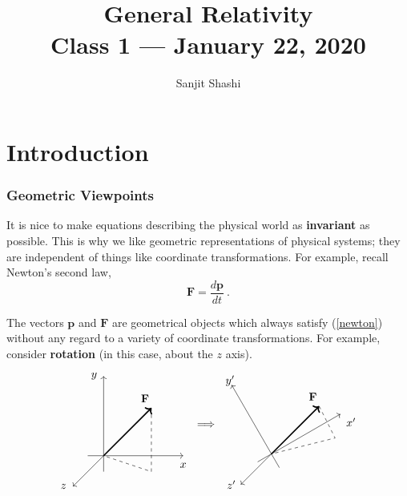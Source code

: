 \documentclass[11pt]{article}
\title{{\Huge General Relativity}\\{\Large{Class 1 --- January 22, 2020}}} %
\author{Sanjit Shashi}
\begin{document}
\maketitle
\flushbottom
\newpage
\pagestyle{fancynotes}

\part{Introduction}
\section{Geometric Viewpoints}

It is nice to make equations describing the physical world as \textbf{invariant} as possible. This is why we like geometric representations of physical systems; they are independent of things like coordinate transformations. For example, recall Newton's second law,
\begin{equation}
\textbf{F} = \frac{d\textbf{p}}{dt}\ .\label{newton}
\end{equation}

The vectors $\textbf{p}$ and $\textbf{F}$ are geometrical objects which always satisfy (\ref{newton}) without any regard to a variety of coordinate transformations. For example, consider \textbf{rotation} (in this case, about the $z$ axis).
\[
\begin{tikzpicture}
\draw[->] (-0.5,0,0) to (2.5,0,0);
\draw[->] (0,-0.5,0) to (0,2.5,0);
\draw[->] (0,0,-0.5) to (0,0,2.5);

\node at (2.5,-0.3) {$x$};
\node at (-0.3,2.5) {$y$};
\node at (-0.3,0,2.5) {$z$};

\draw[->,very thick] (0,0,0) to (1.5,1.5,0);
\node at (1.3,1.8,0) {$\textbf{F}$};

\draw[-,dashed] (1.5,1.5) to (1.5,-0.5) to (0,0);
\end{tikzpicture}
\begin{tikzpicture}
\node at (0,0) {$\implies$};
\node at (0,-2) {};
\end{tikzpicture}
\begin{tikzpicture}
\draw[->,rotate=30] (-0.5,0,0) to (2.5,0,0);
\draw[->,rotate=30] (0,-0.5,0) to (0,2.5,0);
\draw[->] (0,0,-0.5) to (0,0,2.5);

\node at (2.5,1) {$x'$};
\node at (-1.3,2.3) {$y'$};
\node at (-0.3,0,2.5) {$z'$};

\draw[->,very thick] (0,0,0) to (1.5,1.5,0);
\node at (1.3,1.8,0) {$\textbf{F}$};

\draw[-,dashed] (1.5,1.5) to (2,0.5) to (0,0);
\end{tikzpicture}
\]
\end{document}

